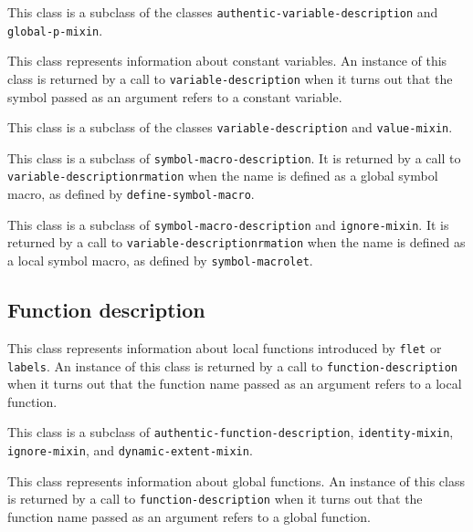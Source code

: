 This class is a subclass of the classes
\texttt{authentic-variable-description} and \texttt{global-p-mixin}.

{\footnotesize
{}
}

This class represents information about constant variables.   An
instance of this class is returned by a call to \texttt{variable-description}
when it turns out that the symbol passed as an argument refers to a
constant variable.

This class is a subclass of the classes \texttt{variable-description} and
\texttt{value-mixin}.

{\footnotesize
{}
}

This class is a subclass of \texttt{symbol-macro-description}.  It is
returned by a call to \texttt{variable-descriptionrmation} when the name is
defined as a global symbol macro, as defined by
\texttt{define-symbol-macro}.

{\footnotesize
{}
}

This class is a subclass of \texttt{symbol-macro-description} and
\texttt{ignore-mixin}.  It is returned by a call to
\texttt{variable-descriptionrmation} when the name is defined as a local
symbol macro, as defined by \texttt{symbol-macrolet}.

\subsection{Function description}
\label{sec-instantiable-classes-function-desciption}

{\footnotesize
{}
}

This class represents information about local functions introduced by
\texttt{flet} or \texttt{labels}.  An instance of this class is
returned by a call to \texttt{function-description} when it turns out that
the function name passed as an argument refers to a local function.

This class is a subclass of \texttt{authentic-function-description},
\texttt{identity-mixin}, \texttt{ignore-mixin}, and \texttt{dynamic-extent-mixin}.

{\footnotesize
{}
}

This class represents information about global functions.  An instance
of this class is returned by a call to \texttt{function-description} when it
turns out that the function name passed as an argument refers to a
global function.

